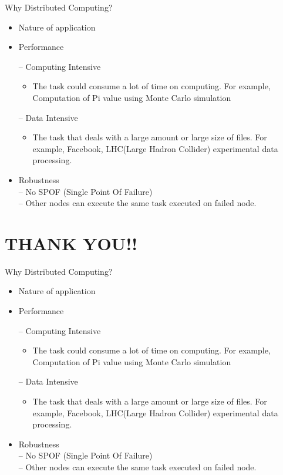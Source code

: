 \documentclass{SKP-beamer}
\begin{document}
\begin{frame}{Why Distributed Computing?}
	\begin{itemize}
		\item Nature of application
		\item Performance
		
	
         	-- Computing Intensive
		\begin{itemize}
		\item The task could consume a lot of time on computing. For 
		example, Computation of Pi value using Monte Carlo simulation
	\end{itemize}
	       -- Data Intensive
	       \begin{itemize}
	       	\item The task that deals with a large amount or large size of files. For 
	       	example, Facebook, LHC(Large Hadron Collider) experimental data 
	       	processing.
	       \end{itemize}
	     \item Robustness \\
	       -- No SPOF (Single Point Of Failure)\\
	       -- Other nodes can execute the same task executed on failed 
	       node.
	       
    \end{itemize}
\end{frame}


\section{\textbf{THANK YOU!!}}

\begin{frame}
	\titlepage
\end{frame}


\begin{frame}{Why Distributed Computing?}
	\begin{itemize}
		\item Nature of application
		\item Performance
		
		
		-- Computing Intensive
		\begin{itemize}
			\item The task could consume a lot of time on computing. For 
			example, Computation of Pi value using Monte Carlo simulation
		\end{itemize}
		-- Data Intensive
		\begin{itemize}
			\item The task that deals with a large amount or large size of files. For 
			example, Facebook, LHC(Large Hadron Collider) experimental data 
			processing.
		\end{itemize}
		\item Robustness \\
		-- No SPOF (Single Point Of Failure)\\
		-- Other nodes can execute the same task executed on failed 
		node.
		
	\end{itemize}
\end{frame}
\end{document}
